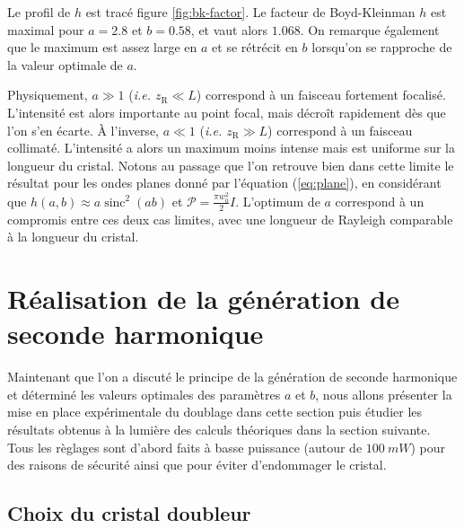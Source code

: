 \documentclass[11pt,a4paper]{article}
\newcommand{\zr}{z_\mathsc{R}}
\newcommand{\chie}{\chi_\mathsc{eff}}
\DeclareMathOperator{\sinc}{sinc}
\renewcommand{\P}{\mathscr{P}}
\newcommand{\mathsc}[1]{\mathrm{\scriptscriptstyle {#1}}}
\begin{document}
Le profil de $h$ est tracé figure \ref{fig:bk-factor}. Le facteur de Boyd-Kleinman $h$ est maximal pour $a=2.8$ et $b=0.58$, et vaut alors $1.068$. On remarque également que le maximum est assez large en $a$ et se rétrécit en $b$ lorsqu'on se rapproche de la valeur optimale de $a$.

Physiquement, $a\gg1$ (\textit{i.e. $\zr \ll L$}) correspond à un faisceau fortement focalisé. L'intensité est alors importante au point focal, mais décroît rapidement dès que l'on s'en écarte. À l'inverse, $a\ll1$ (\textit{i.e. $\zr \gg L$}) correspond à un faisceau collimaté. L'intensité a alors un maximum moins intense mais est uniforme sur la longueur du cristal. Notons au passage que l'on retrouve bien dans cette limite le résultat pour les ondes planes donné par l'équation (\ref{eq:plane}), en considérant que $h(a,b) \approx a \sinc^2(ab)$ et $\P = \frac{\pi w_0^2}{2} I$.
L'optimum de $a$ correspond à un compromis entre ces deux cas limites, avec une longueur de Rayleigh comparable à la longueur du cristal.



\section{Réalisation de la génération  de seconde harmonique}  

Maintenant que l'on a discuté le principe de la génération de seconde harmonique et déterminé les valeurs optimales des paramètres $a$ et $b$, nous allons présenter la mise en place expérimentale du doublage dans cette section puis étudier les résultats obtenus à la lumière des calculs théoriques dans la section suivante. Tous les règlages sont d'abord faits à basse puissance (autour de $\SI{100}{mW}$) pour des raisons de sécurité ainsi que pour éviter d'endommager le cristal.

\subsection{Choix du cristal doubleur}
\end{document}
